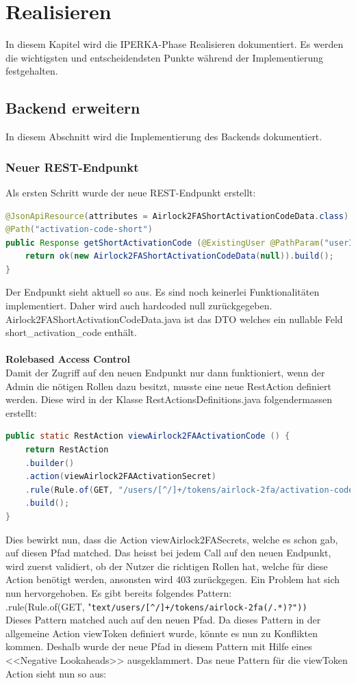 \chapter{Realisieren}\label{ch:realisieren}
In diesem Kapitel wird die IPERKA-Phase Realisieren dokumentiert. Es werden die wichtigsten und entscheidendsten Punkte während der Implementierung festgehalten. 

\section{Backend erweitern}
In diesem Abschnitt wird die Implementierung des Backends dokumentiert. 
\subsection{Neuer REST-Endpunkt}
Als ersten Schritt wurde der neue REST-Endpunkt erstellt:
\begin{lstlisting}[language=Java]
	@JsonApiResource(attributes = Airlock2FAShortActivationCodeData.class)
@Path("activation-code-short")
public Response getShortActivationCode (@ExistingUser @PathParam("userId") @Parameter(schema = @Schema(type = "string")) UserParam userParam) {
	return ok(new Airlock2FAShortActivationCodeData(null)).build();
}
\end{lstlisting}
Der Endpunkt sieht aktuell so aus. Es sind noch keinerlei Funktionalitäten implementiert. Daher wird auch hardcoded null zurückgegeben. Airlock2FAShortActivationCodeData.java ist das DTO welches ein nullable Feld \flqq short\_activation\_code\frqq{} enthält. \\
\\
\textbf{Rolebased Access Control}\\
Damit der Zugriff auf den neuen Endpunkt nur dann funktioniert, wenn der Admin die nötigen Rollen dazu besitzt, musste eine neue RestAction definiert werden. Diese wird in der Klasse RestActionsDefinitions.java folgendermassen erstellt:
\begin{lstlisting}[language=Java]
	public static RestAction viewAirlock2FAActivationCode () {
	return RestAction
	.builder()
	.action(viewAirlock2FAActivationSecret)
	.rule(Rule.of(GET, "/users/[^/]+/tokens/airlock-2fa/activation-code-short"))
	.build();
}
\end{lstlisting}
Dies bewirkt nun, dass die Action \flqq viewAirlock2FASecrets\frqq{}, welche es schon gab, auf diesen Pfad matched. Das heisst bei jedem Call auf den neuen Endpunkt, wird zuerst validiert, ob der Nutzer die richtigen Rollen hat, welche für diese Action benötigt werden, ansonsten wird 403 zurückgegen.
Ein Problem hat sich nun hervorgehoben. Es gibt bereits folgendes Pattern:\\
 \flqq .rule(Rule.of(GET, "\verb*|text/users/[^/]+/tokens/airlock-2fa(/.*)?"))|\frqq{}
\\
Dieses Pattern matched auch auf den neuen Pfad. Da dieses Pattern in der allgemeine Action \flqq viewToken \frqq{} definiert wurde, könnte es nun zu Konflikten kommen. Deshalb wurde der neue Pfad in diesem Pattern mit Hilfe eines <<Negative Lookaheads>> ausgeklammert. Das neue Pattern für die viewToken Action sieht nun so aus:\\


